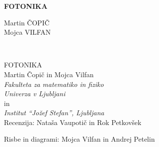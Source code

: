 \documentclass[11pt,fleqn]{book} %
\begin{document}
\let\cleardoublepage\clearpage
\makeatletter
\setlength{\@fptop}{0pt}
\makeatother




\begingroup
\thispagestyle{empty}
\centering
\vspace*{5cm}
\par\normalfont\fontsize{35}{35}\sffamily\selectfont
\textbf{FOTONIKA}
{\LARGE }\par %
\vspace*{1cm}
\vspace*{1cm}
\vspace*{8cm}
{\Large Martin ČOPIČ \\ Mojca VILFAN \\}\par %
\endgroup


\newpage
~\vfill
\thispagestyle{empty}

FOTONIKA \\

Martin Čopič in Mojca Vilfan\\
{\it Fakulteta za matematiko in fiziko\\
Univerza v Ljubljani}\\
in\\
{\it Institut ``Jožef Stefan'', Ljubljana}\\
 
Recenzija: Nataša Vaupotič in Rok Petkovšek %


 Risbe in diagrami: Mojca Vilfan in Andrej Petelin\\ %
 
\end{document}
